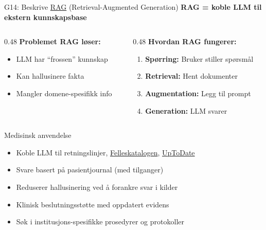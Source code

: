 \documentclass[aspectratio=169, 10pt]{beamer}
\begin{document}
\begin{frame}{G14: Beskrive \href{https://en.wikipedia.org/wiki/Retrieval-augmented_generation}{RAG} (Retrieval-Augmented Generation)}
    \textbf{RAG = koble LLM til ekstern kunnskapsbase}

    \vspace{0.2cm}
    \begin{columns}[T]
        \begin{column}{0.48\textwidth}
            \textbf{Problemet RAG løser:}
            \begin{itemize}
                \item LLM har ``frossen'' kunnskap
                \item Kan hallusinere fakta
                \item Mangler domene-spesifikk info
            \end{itemize}
        \end{column}
        \begin{column}{0.48\textwidth}
            \textbf{Hvordan RAG fungerer:}
            \begin{enumerate}
                \item \textbf{Spørring:} Bruker stiller spørsmål
                \item \textbf{Retrieval:} Hent dokumenter
                \item \textbf{Augmentation:} Legg til prompt
                \item \textbf{Generation:} LLM svarer
            \end{enumerate}
        \end{column}
    \end{columns}

    \vspace{0.15cm}
    \begin{block}{\footnotesize Medisinsk anvendelse}
        \scriptsize
        \begin{itemize}
            \item Koble LLM til retningslinjer, \href{https://www.felleskatalogen.no/}{Felleskatalogen}, \href{https://www.uptodate.com/}{UpToDate}
            \item Svare basert på pasientjournal (med tilganger)
            \item Reduserer hallusinering ved å forankre svar i kilder
            \item Klinisk beslutningsstøtte med oppdatert evidens
            \item Søk i institusjons-spesifikke prosedyrer og protokoller
        \end{itemize}
    \end{block}
\end{frame}
\end{document}
